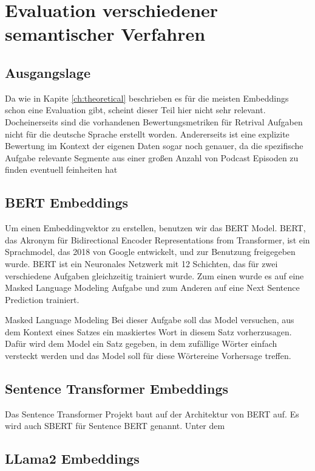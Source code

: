 \chapter{Evaluation verschiedener semantischer Verfahren}\label{ch:experiments}

\section{Ausgangslage}

Da wie in Kapite \autoref*{ch:theoretical} beschrieben es für die meisten Embeddings schon eine Evaluation gibt, scheint dieser Teil hier nicht sehr relevant.
Docheinerseits sind die vorhandenen Bewertungsmetriken für Retrival Aufgaben nicht für die deutsche Sprache erstellt worden.
Andererseits ist eine explizite Bewertung im Kontext der eigenen Daten sogar noch genauer, da die spezifische Aufgabe relevante Segmente aus einer großen Anzahl von Podcast Episoden zu finden eventuell feinheiten hat

\section{BERT Embeddings}

Um einen Embeddingvektor zu erstellen, benutzen wir das BERT Model. BERT, das Akronym für Bidirectional Encoder Representations from Transformer, ist ein Sprachmodel, das 2018 von Google entwickelt, und zur Benutzung freigegeben wurde. 
BERT ist ein Neuronales Netzwerk mit 12 Schichten, das für zwei verschiedene Aufgaben gleichzeitig trainiert wurde. Zum einen wurde es auf eine Masked Language Modeling Aufgabe und zum Anderen auf eine Next Sentence Prediction trainiert. 

Masked Language Modeling
Bei dieser Aufgabe soll das Model versuchen, aus dem Kontext eines Satzes ein maskiertes Wort in diesem Satz vorherzusagen. Dafür wird dem Model ein Satz gegeben, in dem zufällige Wörter einfach versteckt werden und das Model soll für diese Wörtereine Vorhersage treffen. 


\section{Sentence Transformer Embeddings}

Das Sentence Transformer Projekt baut auf der Architektur von BERT auf. 
Es wird auch SBERT für Sentence BERT genannt. 
Unter dem 

\section{LLama2 Embeddings}

